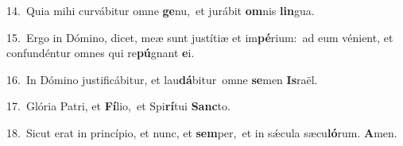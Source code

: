 {\numbfont\textcolor{\numbcolor}{14.}}~Quia mihi curvábitur omne \textbf{ge}\-nu,~\star et jurábit \textbf{om}\-nis \textbf{lin}\-gua.\par
{\numbfont\textcolor{\numbcolor}{15.}}~Ergo in Dómino, dicet, meæ sunt justítiæ et im\-\textbf{pé}\-rium:~\star ad eum vénient, et confundéntur omnes qui re\-\textbf{pú}\-gnant \textbf{e}\-i.\par
{\numbfont\textcolor{\numbcolor}{16.}}~In Dómino justificábitur, et lau\-\textbf{dá}\-bitur~\star omne \textbf{se}\-men \textbf{Is}\-raël.\par
{\numbfont\textcolor{\numbcolor}{17.}}~Glória Patri, et \textbf{Fí}\-lio,~\star et Spi\-\textbf{rí}\-tui \textbf{Sanc}\-to.\par
{\numbfont\textcolor{\numbcolor}{18.}}~Sicut erat in princípio, et nunc, et \textbf{sem}\-per,~\star et in sǽcula sæcu\-\textbf{ló}\-rum. \textbf{A}\-men.\par
